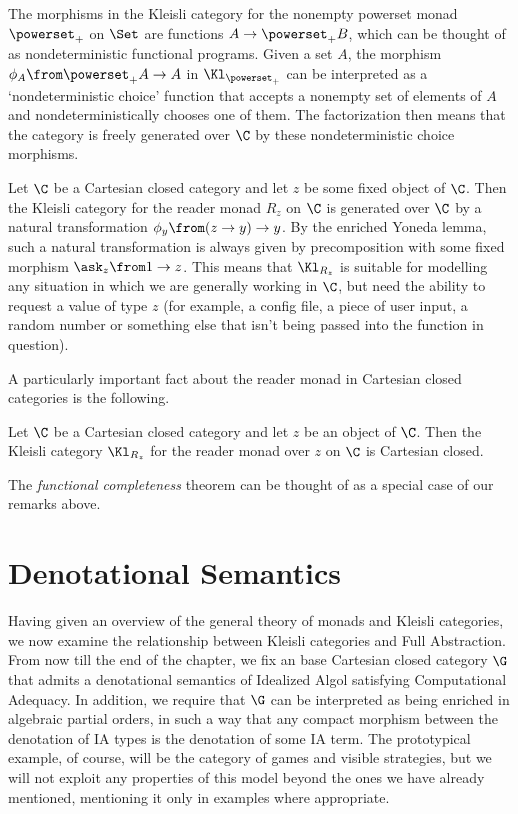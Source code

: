 \begin{example}
  The morphisms in the Kleisli category for the nonempty powerset monad $\powerset_+$ on $\Set$ are functions $A \to \powerset_+B$, which can be thought of as nondeterministic functional programs.  
  Given a set $A$, the morphism $\phi_A\from \powerset_+A \to A$ in $\Kl_{\powerset_+}$ can be interpreted as a `nondeterministic choice' function that accepts a nonempty set of elements of $A$ and nondeterministically chooses one of them.
  The factorization then means that the category is freely generated over $\C$ by these nondeterministic choice morphisms.
\end{example}
\begin{example}
  Let $\C$ be a Cartesian closed category and let $z$ be some fixed object of $\C$.  
  Then the Kleisli category for the reader monad $R_z$ on $\C$ is generated over $\C$ by a natural transformation $\phi_y\from (z \to y) \to y$.  
  By the enriched Yoneda lemma, such a natural transformation is always given by precomposition with some fixed morphism $\ask_z\from 1 \to z$.  
  This means that $\Kl_{R_z}$ is suitable for modelling any situation in which we are generally working in $\C$, but need the ability to request a value of type $z$ (for example, a config file, a piece of user input, a random number or something else that isn't being passed into the function in question).
  \label{ExReaderMonadKleisli}
\end{example}

A particularly important fact about the reader monad in Cartesian closed categories is the following.

\begin{theorem}
  Let $\C$ be a Cartesian closed category and let $z$ be an object of $\C$.  
  Then the Kleisli category $\Kl_{R_z}$ for the reader monad over $z$ on $\C$ is Cartesian closed.
  \label{FunctionalCompletenessCcc}
\end{theorem}

The \emph{functional completeness} theorem \cite{FunctionalCompleteness} can be thought of as a special case of our remarks above.

\section{Denotational Semantics}

Having given an overview of the general theory of monads and Kleisli categories, we now examine the relationship between Kleisli categories and Full Abstraction.  From now till the end of the chapter, we fix an base Cartesian closed category $\G$ that admits a denotational semantics of Idealized Algol satisfying Computational Adequacy.  
In addition, we require that $\G$ can be interpreted as being enriched in algebraic partial orders, in such a way that any compact morphism between the denotation of IA types is the denotation of some IA term.
The prototypical example, of course, will be the category of games and visible strategies, but we will not exploit any properties of this model beyond the ones we have already mentioned, mentioning it only in examples where appropriate.

